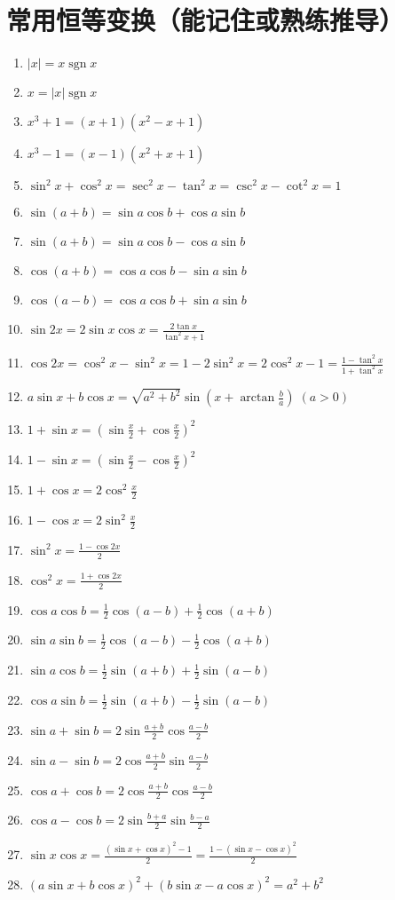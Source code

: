 \documentclass{ctexbook}
\DeclareMathOperator{\sgn}{sgn}
\begin{document}
\section{常用恒等变换（能记住或熟练推导）}
\begin{enumerate}
	\item$\left|x\right|=x\sgn{x}$
	\item$ x=\left|x\right|\sgn{x}$
	\item$ x^{3}+1=\left(x+1\right)\left(x^{2}-x+1\right)$
	\item$ x^{3}-1=\left(x-1\right)\left(x^{2}+x+1\right)$
	\item$\sin^{2}{x}+\cos^{2}{x}=\sec^{2}{x}-\tan^{2}{x}=\csc^{2}{x}-\cot^{2}{x}=1$
	\item$\sin{\left(a+b\right)}=\sin{a}\cos{b}+\cos{a}\sin{b}$
	\item$\sin{\left(a+b\right)}=\sin{a}\cos{b}-\cos{a}\sin{b}$
	\item$\cos{\left(a+b\right)}=\cos{a}\cos{b}-\sin{a}\sin{b}$
	\item$\cos{\left(a-b\right)}=\cos{a}\cos{b}+\sin{a}\sin{b}$
	\item$\sin{2x}=2\sin{x}\cos{x}=\frac{2\tan{x}}{\tan^{2}{x}+1}$
	\item$\cos{2x}=\cos^{2}{x}-\sin^{2}{x}=1-2\sin^{2}{x}=2\cos^{2}{x}-1=\frac{1-\tan^{2}{x}}{1+\tan^{2}{x}}$
	\item$ a\sin{x}+b\cos{x}=\sqrt{a^{2}+b^{2}}\sin{\left(x+\arctan{\frac{b}{a}}\right)}\;\left(a>0\right)$
	\item$1+\sin{x}=\left(\sin{\frac{x}{2}}+\cos{\frac{x}{2}}\right)^{2}$
	\item$1-\sin{x}=\left(\sin{\frac{x}{2}}-\cos{\frac{x}{2}}\right)^{2}$
	\item$1+\cos{x}=2\cos^{2}{\frac{x}{2}}$
	\item$1-\cos{x}=2\sin^{2}{\frac{x}{2}}$
	\item$\sin^{2}{x}=\frac{1-\cos{2x}}{2}$
	\item$\cos^{2}{x}=\frac{1+\cos{2x}}{2}$
	\item$\cos{a}\cos{b}=\frac{1}{2}\cos{\left(a-b\right)}+\frac{1}{2}\cos{\left(a+b\right)}$
	\item$\sin{a}\sin{b}=\frac{1}{2}\cos{\left(a-b\right)}-\frac{1}{2}\cos{\left(a+b\right)}$
	\item$\sin{a}\cos{b}=\frac{1}{2}\sin{\left(a+b\right)}+\frac{1}{2}\sin{\left(a-b\right)}$
	\item$\cos{a}\sin{b}=\frac{1}{2}\sin{\left(a+b\right)}-\frac{1}{2}\sin{\left(a-b\right)}$
	\item$\sin{a}+\sin{b}=2\sin{\frac{a+b}{2}}\cos{\frac{a-b}{2}}$
	\item$\sin{a}-\sin{b}=2\cos{\frac{a+b}{2}}\sin{\frac{a-b}{2}}$
	\item$\cos{a}+\cos{b}=2\cos{\frac{a+b}{2}}\cos{\frac{a-b}{2}}$
	\item$\cos{a}-\cos{b}=2\sin{\frac{b+a}{2}}\sin{\frac{b-a}{2}}$
	\item$\sin{x}\cos{x}=\frac{\left(\sin{x}+\cos{x}\right)^{2}-1}{2}=\frac{1-\left(\sin{x}-\cos{x}\right)^{2}}{2}$
	\item$\left(a\sin{x}+b\cos{x}\right)^{2}+\left(b\sin{x}-a\cos{x}\right)^{2}=a^{2}+b^{2}$
\end{enumerate}
\end{document}
